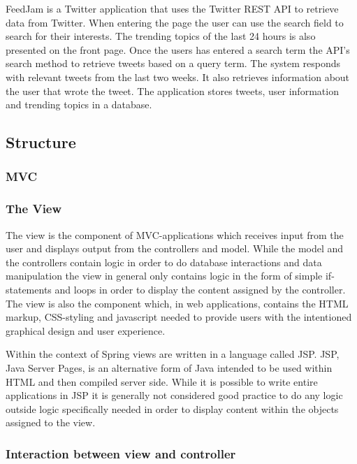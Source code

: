 FeedJam is a Twitter application that uses the Twitter REST API to retrieve data from Twitter. When entering the page the user can use the search field to search for their interests. The trending topics of the last 24 hours is also presented on the front page. Once the users has entered a search term the API's search method to retrieve tweets based on a query term. 
The system responds with relevant tweets from the last two weeks. It also retrieves information about the user that wrote the tweet. The application stores tweets, user information and trending topics in a database. 

\subsection{Structure}
\subsubsection{MVC} %

\subsubsection{The View}
The view is the component of MVC-applications which receives input from the user and displays output from the controllers and model. While the model and the controllers contain logic in order to do database interactions and data manipulation the view in general only contains logic in the form of simple if-statements and loops in order to display the content assigned by the controller. The view is also the component which, in web applications, contains the HTML markup, CSS-styling and javascript needed to provide users with the intentioned graphical design and user experience.

Within the context of Spring views are written in a language called JSP. JSP, Java Server Pages, is an alternative form of Java intended to be used within HTML and then compiled server side. While it is possible to write entire applications in JSP it is generally not considered good practice to do any logic outside logic specifically needed in order to display content within the objects assigned to the view. 

\subsubsection{Interaction between view and controller} %

